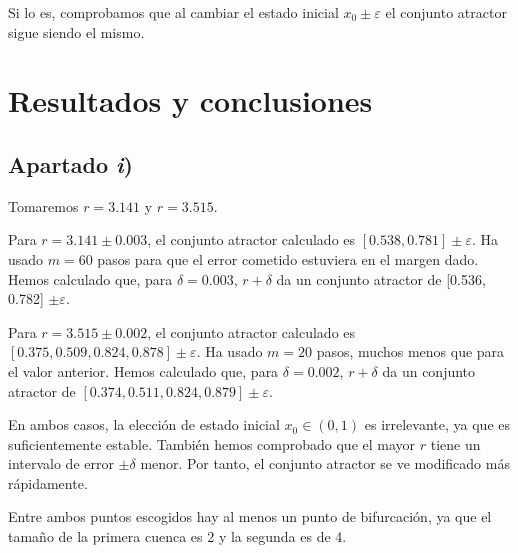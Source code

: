 \documentclass[a4paper]{article}
\begin{document}
	Si lo es, comprobamos que al cambiar el estado inicial $x_0\pm\varepsilon$ el conjunto atractor sigue siendo el mismo.
	
	
	
	
	\section{Resultados y conclusiones}
	\subsection{Apartado \textit{i})}
	
	Tomaremos $r=3.141$ y $r=3.515$.
	
	Para $r=3.141\pm 0.003$, el conjunto atractor calculado es $[0.538, 0.781]\pm \varepsilon$. Ha usado $m=60$ pasos para que el error cometido estuviera en el margen dado.
	Hemos calculado que, para $\delta=0.003$, $r+\delta$ da un conjunto atractor de [0.536, 0.782] $\pm \varepsilon$.
	
	Para $r=3.515\pm 0.002$, el conjunto atractor calculado es $[0.375, 0.509, 0.824, 0.878] \pm \varepsilon$. Ha usado $m=20$ pasos, muchos menos que para el valor anterior.
	Hemos calculado que, para $\delta=0.002$, $r+\delta$ da un conjunto atractor de $[0.374, 0.511, 0.824, 0.879] \pm \varepsilon$.
	
	En ambos casos, la elección de estado inicial $x_0\in(0,1)$ es irrelevante, ya que es suficientemente estable. También hemos comprobado que el mayor $r$ tiene un intervalo de error $\pm\delta$ menor. Por tanto, el conjunto atractor se ve modificado más rápidamente. 
	
	Entre ambos puntos escogidos hay al menos un punto de bifurcación, ya que el tamaño de la primera cuenca es 2 y la segunda es de 4.
	
\end{document}
